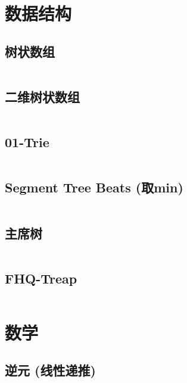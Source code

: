\documentclass[twoside,twocolumn]{article}
\begin{document}
\section{数据结构}


\subsection{树状数组}
\inputminted[breaklines, frame=single]{c++}{../algo/数据结构/树状数组.cpp}


\subsection{二维树状数组}
\inputminted[breaklines, frame=single]{c++}{../algo/数据结构/二维树状数组.cpp}


\subsection{01-Trie}
\inputminted[breaklines, frame=single]{c++}{../algo/数据结构/01-trie.cpp}

\subsection{Segment Tree Beats (取min)}
\inputminted[breaklines, frame=single]{c++}{../algo/数据结构/SGB【区间取min】.cpp}


\subsection{主席树}
\inputminted[breaklines, frame=single]{c++}{../algo/数据结构/主席树.cpp}

\subsection{FHQ-Treap}
\inputminted[breaklines, frame=single]{c++}{../algo/数据结构/权值无旋Treap(fhq).cpp}




\section{数学}
\subsection{逆元 (线性递推)}
\inputminted[breaklines, frame=single]{c++}{../algo/数学/逆元【O(n)预处理】.cpp}
\end{document}
